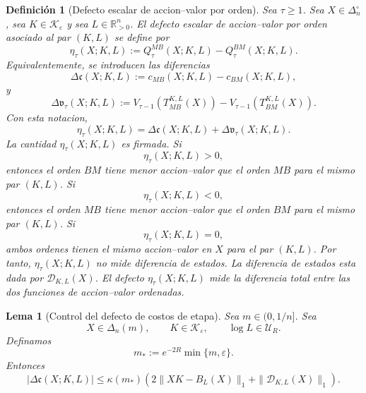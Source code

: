 ﻿\documentclass[12pt]{article}
\newtheorem{definicion}{Definición}[section]
\newtheorem{lema}{Lema}[section]
\begin{document}
\begin{definicion}[Defecto escalar de accion--valor por orden]\label{def:defecto_escalar_accion_valor_orden}
Sea \(\tau\ge 1\). Sea \(X\in\Delta_n^\circ\), sea \(K\in\mathcal K_\varepsilon\) y sea \(L\in\mathbb R_{>0}^n\). El defecto escalar de accion--valor por orden asociado al par \((K,L)\) se define por
\[
\eta_\tau(X;K,L)
:=
Q_\tau^{MB}(X;K,L)-Q_\tau^{BM}(X;K,L).
\]
Equivalentemente, se introducen las diferencias
\[
\Delta\mathfrak c(X;K,L)
:=
c_{MB}(X;K,L)-c_{BM}(X;K,L),
\]
y
\[
\Delta\mathfrak v_\tau(X;K,L)
:=
V_{\tau-1}\!\left(T_{MB}^{K,L}(X)\right)
-
V_{\tau-1}\!\left(T_{BM}^{K,L}(X)\right).
\]
Con esta notacion,
\[
\eta_\tau(X;K,L)
=
\Delta\mathfrak c(X;K,L)
+
\Delta\mathfrak v_\tau(X;K,L).
\]
La cantidad \(\eta_\tau(X;K,L)\) es firmada. Si
\[
\eta_\tau(X;K,L)>0,
\]
entonces el orden \(BM\) tiene menor accion--valor que el orden \(MB\) para el mismo par \((K,L)\). Si
\[
\eta_\tau(X;K,L)<0,
\]
entonces el orden \(MB\) tiene menor accion--valor que el orden \(BM\) para el mismo par \((K,L)\). Si
\[
\eta_\tau(X;K,L)=0,
\]
ambos ordenes tienen el mismo accion--valor en \(X\) para el par \((K,L)\).
Por tanto, \(\eta_\tau(X;K,L)\) no mide diferencia de estados. La diferencia de estados esta dada por \(\mathcal D_{K,L}(X)\). El defecto \(\eta_\tau(X;K,L)\) mide la diferencia total entre las dos funciones de accion--valor ordenadas.
\end{definicion}

\begin{lema}[Control del defecto de costos de etapa]\label{lem:control_defecto_costos_etapa}
Sea \(m\in(0,1/n]\). Sea
\[
X\in\Delta_n(m),
\qquad
K\in\mathcal K_\varepsilon,
\qquad
\log L\in\mathcal U_R.
\]
Definamos
\[
m_*:=e^{-2R}\min\{m,\varepsilon\}.
\]
Entonces
\[
|\Delta\mathfrak c(X;K,L)|
\le
\kappa(m_*)
\left(
2\|XK-B_L(X)\|_1
+
\|\mathcal D_{K,L}(X)\|_1
\right).
\]
\end{lema}
\end{document}
